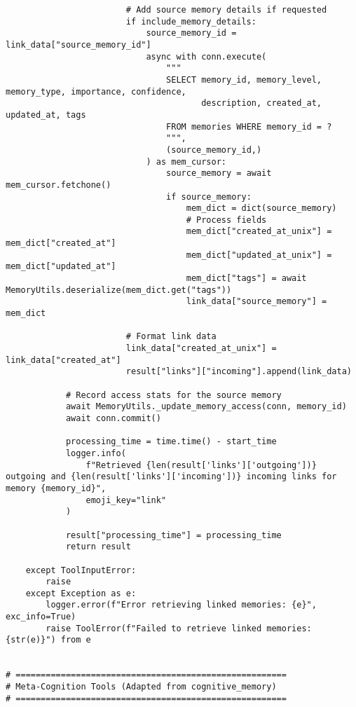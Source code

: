 \documentclass[12pt,a4paper]{article}
\begin{document}
\begin{pageablecode}
\begin{verbatim}
                        # Add source memory details if requested
                        if include_memory_details:
                            source_memory_id = link_data["source_memory_id"]
                            async with conn.execute(
                                """
                                SELECT memory_id, memory_level, memory_type, importance, confidence, 
                                       description, created_at, updated_at, tags
                                FROM memories WHERE memory_id = ?
                                """, 
                                (source_memory_id,)
                            ) as mem_cursor:
                                source_memory = await mem_cursor.fetchone()
                                if source_memory:
                                    mem_dict = dict(source_memory)
                                    # Process fields
                                    mem_dict["created_at_unix"] = mem_dict["created_at"]
                                    mem_dict["updated_at_unix"] = mem_dict["updated_at"]
                                    mem_dict["tags"] = await MemoryUtils.deserialize(mem_dict.get("tags"))
                                    link_data["source_memory"] = mem_dict
                        
                        # Format link data
                        link_data["created_at_unix"] = link_data["created_at"]
                        result["links"]["incoming"].append(link_data)
            
            # Record access stats for the source memory
            await MemoryUtils._update_memory_access(conn, memory_id)
            await conn.commit()
            
            processing_time = time.time() - start_time
            logger.info(
                f"Retrieved {len(result['links']['outgoing'])} outgoing and {len(result['links']['incoming'])} incoming links for memory {memory_id}",
                emoji_key="link"
            )
            
            result["processing_time"] = processing_time
            return result
    
    except ToolInputError:
        raise
    except Exception as e:
        logger.error(f"Error retrieving linked memories: {e}", exc_info=True)
        raise ToolError(f"Failed to retrieve linked memories: {str(e)}") from e


# ======================================================
# Meta-Cognition Tools (Adapted from cognitive_memory)
# ======================================================


\end{verbatim}
\end{pageablecode}
\end{document}
